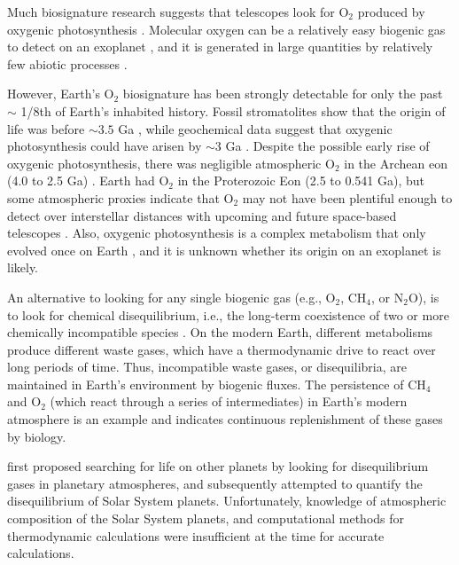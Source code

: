 Much biosignature research suggests that telescopes look for O$_2$ produced by oxygenic photosynthesis \citep{Meadows_2017,Meadows_2018,Owen_1980}. Molecular oxygen can be a relatively easy biogenic gas to detect on an exoplanet \citep{Meadows_2017}, and it is generated in large quantities by relatively few abiotic processes \citep{Meadows_2018}.

However, Earth's O$_2$ biosignature has been strongly detectable for only the past $\sim$ 1/8th of Earth's inhabited history. Fossil stromatolites show that the origin of life was before $\sim 3.5$ Ga \citep{Walter_1980}, while geochemical data suggest that oxygenic photosynthesis could have arisen by $\sim 3$ Ga \citep{Planavsky_2014_photo}. Despite the possible early rise of oxygenic photosynthesis, there was negligible atmospheric O$_2$ in the Archean eon (4.0 to 2.5 Ga) \citep{Farquhar_2000}. Earth had O$_2$ in the Proterozoic Eon (2.5 to 0.541 Ga), but some atmospheric proxies \citep{Planavsky_2014_proto} indicate that O$_2$ may not have been plentiful enough to detect over interstellar distances with upcoming and future space-based telescopes \citep{KrissansenTotton_2018_detect,Reinhard_2017}. Also, oxygenic photosynthesis is a complex metabolism that only evolved once on Earth \citep{Fischer_2016}, and it is unknown whether its origin on an exoplanet is likely.

An alternative to looking for any single biogenic gas (e.g., O$_2$, CH$_4$, or N$_2$O), is to look for chemical disequilibrium, i.e., the long-term coexistence of two or more chemically incompatible species \citep{Lovelock_1965,Lovelock_1975}. On the modern Earth, different metabolisms produce different waste gases, which have a thermodynamic drive to react over long periods of time. Thus, incompatible waste gases, or disequilibria, are maintained in Earth's environment by biogenic fluxes. The persistence of CH$_4$ and O$_2$ (which react through a series of intermediates) in Earth's modern atmosphere is an example and indicates continuous replenishment of these gases by biology. 

\citet{Lovelock_1965} first proposed searching for life on other planets by looking for disequilibrium gases in planetary atmospheres, and subsequently \citet{Lovelock_1975} attempted to quantify the disequilibrium of Solar System planets. Unfortunately, knowledge of atmospheric composition of the Solar System planets, and computational methods for thermodynamic calculations were insufficient at the time for accurate calculations.

